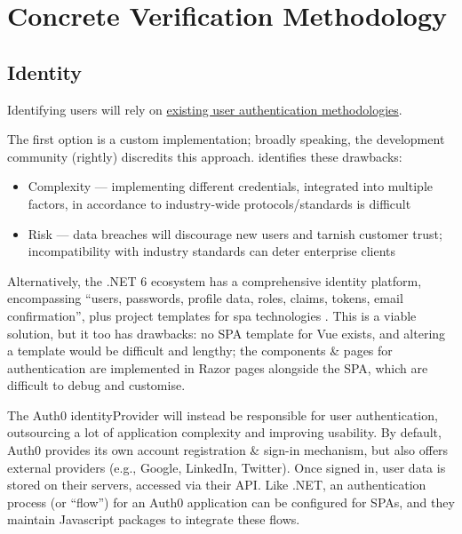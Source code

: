 \section{Concrete Verification Methodology}

\subsection{Identity}

Identifying users will rely on
\hyperref[s:userAuth]{existing user authentication
  methodologies}.

The first option is a custom implementation; broadly
speaking, the development community (rightly) discredits
this approach.
\cite{noCustomAuth} identifies these drawbacks:

\begin{itemize}

  \item Complexity --- implementing different credentials,
        integrated into multiple
        factors, in accordance to industry-wide
        protocols/standards is difficult

  \item Risk --- data breaches will discourage new users
        and tarnish customer trust; incompatibility with
        industry standards can deter enterprise clients

\end{itemize}

Alternatively, the .NET 6 ecosystem has a comprehensive
identity platform, encompassing \enquote{users, passwords,
  profile data, roles, claims, tokens, email confirmation},
plus project templates for \gls{spa} technologies
\parencite{netIdentity}.
This is a viable solution, but it too has drawbacks: no SPA
template for Vue exists, and altering a template would be
difficult and lengthy; the components \& pages for
authentication are implemented in Razor pages alongside the
SPA, which are difficult to debug and customise.

The Auth0 \gls{identityProvider} will instead be
responsible for user authentication, outsourcing a lot of
application complexity and improving usability.
By default, Auth0 provides its own account registration \&
sign-in mechanism, but also offers external providers
(e.g., Google, LinkedIn, Twitter).
Once signed in, user data is stored on their servers,
accessed via their API.
Like .NET, an authentication process (or \enquote{flow})
for an Auth0 application can be configured for SPAs, and
they maintain Javascript packages to integrate these flows.

